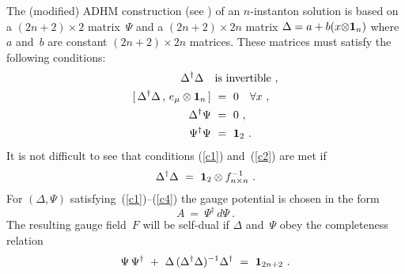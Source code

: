 \documentclass[a4paper,11pt]{article}
\numberwithin{equation}{section}
\def\+{\dagger}
\begin{document}
{The (modified) ADHM construction (see 
\cite{Nekrasov:1998ss,Ho:2000ea,Furuuchi:2001vx,Nekrasov:2000ih,Chu:2001cx})
of an $n$-instanton solution is based on a $(2n{+}2)\times2$ matrix~$\Psi$
and a $(2n{+}2)\times2n$ matrix $\Delta=a+b(x{\otimes}{\bf1}_n)$
where $a$ and~$b$ are constant $(2n{+}2)\times2n$ matrices.
These matrices must satisfy the following conditions:
\begin{align}
\Delta^\+\Delta\quad& \textrm{is invertible}\ ,\label{c1}\\
[\,\Delta^\+\Delta\,,\,e_\mu\otimes{\bf1}_n\,]\ &=\ 0 \quad\forall x\ , 
\label{c2}\\
\Delta^\+\Psi\ &=\ 0\ ,\label{c3}\\
\Psi^\+\Psi\ &=\ {\bf1}_2 \ .\label{c4}
\end{align}
It is not difficult to see that conditions (\ref{c1}) and~(\ref{c2})
are met if
\begin{equation} \label{c5}
\Delta^\+\Delta\ =\ {\bf1}_2 \otimes f^{-1}_{n\times n}\ .
\end{equation}
For $(\Delta,\Psi)$ satisfying~(\ref{c1})--(\ref{c4}) 
the gauge potential is chosen in the form
\begin{equation} \label{adhmA}
A\ =\ \Psi^\+\,d\Psi\ .
\end{equation}
The resulting gauge field~$F$ will be self-dual if $\Delta$ and~$\Psi$
obey the completeness relation
\begin{equation} \label{complete}
\Psi\,\Psi^\+\ +\ \Delta\,(\Delta^\+\Delta)^{-1}\Delta^\+\ =\ {\bf1}_{2n+2}\ .
\end{equation}

}
\end{document}
